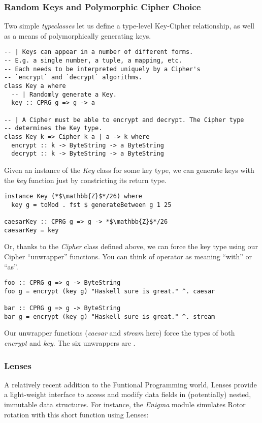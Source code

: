 \documentclass{article}
\begin{document}
\subsubsection{Random Keys and Polymorphic Cipher Choice}
Two simple \emph{typeclasses} let us define a type-level Key-Cipher
relationship, as well as a means of polymorphically generating keys.

\begin{lstlisting}
-- | Keys can appear in a number of different forms.
-- E.g. a single number, a tuple, a mapping, etc.
-- Each needs to be interpreted uniquely by a Cipher's
-- `encrypt` and `decrypt` algorithms.
class Key a where
  -- | Randomly generate a Key.
  key :: CPRG g => g -> a

-- | A Cipher must be able to encrypt and decrypt. The Cipher type
-- determines the Key type.
class Key k => Cipher k a | a -> k where
  encrypt :: k -> ByteString -> a ByteString
  decrypt :: k -> ByteString -> a ByteString  
\end{lstlisting}

Given an instance of the \emph{Key} class for some key type,
we can generate keys with the \emph{key} function just by constricting
its return type.

\begin{lstlisting}
instance Key (*$\mathbb{Z}$*/26) where
  key g = toMod . fst $ generateBetween g 1 25
  
caesarKey :: CPRG g => g -> *$\mathbb{Z}$*/26
caesarKey = key 
\end{lstlisting}

Or, thanks to the \emph{Cipher} class defined above, we can force the key
type using our Cipher ``unwrapper'' functions. You can think of 
 operator as meaning ``with'' or ``as''.

\begin{lstlisting}
foo :: CPRG g => g -> ByteString
foo g = encrypt (key g) "Haskell sure is great." ^. caesar

bar :: CPRG g => g -> ByteString
bar g = encrypt (key g) "Haskell sure is great." ^. stream
\end{lstlisting}

Our unwrapper functions (\emph{caesar} and \emph{stream} here) force the
types of both \emph{encrypt} and \emph{key}. The six unwrappers are
.

\subsubsection{Lenses}
A relatively recent addition to the Funtional Programming world, Lenses
provide a light-weight interface to access and modify data fields in
(potentially) nested,
immutable data structures. For instance, the \emph{Enigma} module
simulates Rotor rotation with this short function using Lenses:
\end{document}
